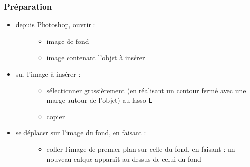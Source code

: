 \documentclass[a4paper,12pt,french]{sphinxmanual}
\begin{document}
\subsubsection{Préparation}
\label{psd/insertion:preparation}\begin{itemize}
\item {} \begin{description}
\item[{depuis Photoshop, ouvrir :}] \leavevmode\begin{itemize}
\item {} 
image de fond

\item {} 
image contenant l'objet à insérer

\end{itemize}

\end{description}

\item {} \begin{description}
\item[{sur l'image à insérer :}] \leavevmode\begin{itemize}
\item {} 
sélectionner grossièrement (en réalisant un contour fermé avec une marge autour de l'objet) au lasso \textbf{\texttt{L}}

\item {} 
copier 

\end{itemize}

\end{description}

\item {} \begin{description}
\item[{se déplacer sur l'image du fond, en faisant  :}] \leavevmode\begin{itemize}
\item {} 
coller l'image de premier-plan sur celle du fond, en faisant  : un nouveau calque apparaît au-dessus de celui du fond

\end{itemize}

\end{description}

\end{itemize}
\end{document}
